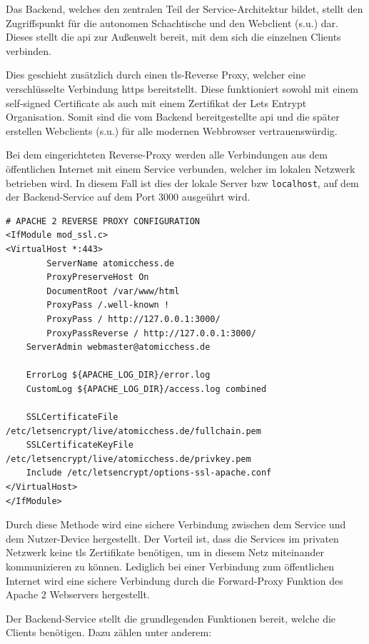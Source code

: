 Das Backend, welches den zentralen Teil der Service-Architektur bildet,
stellt den Zugriffspunkt für die autonomen Schachtische und den
Webclient (s.u.) dar. Dieses stellt die \gls{api} zur Außenwelt bereit,
mit dem sich die einzelnen Clients verbinden.

Dies geschieht zusätzlich durch einen \gls{tls}-Reverse Proxy, welcher
eine verschlüsselte Verbindung \gls{https} bereitstellt. Diese
funktioniert sowohl mit einem self-signed Certificate als auch mit einem
Zertifikat der Lets Entrypt Organisation\cite{letsencrpyt}. Somit
sind die vom Backend bereitgestellte \gls{api} und die später erstellen
Webclients (s.u.) für alle modernen Webbrowser vertrauenswürdig.

Bei dem eingerichteten Reverse-Proxy werden alle Verbindungen aus dem
öffentlichen Internet mit einem Service verbunden, welcher im lokalen
Netzwerk betrieben wird. In diesem Fall ist dies der lokale Server bzw
\passthrough{\lstinline!localhost!}, auf dem der Backend-Service auf dem
Port 3000 ausgeührt wird.

\begin{lstlisting}
# APACHE 2 REVERSE PROXY CONFIGURATION
<IfModule mod_ssl.c>
<VirtualHost *:443>
        ServerName atomicchess.de
        ProxyPreserveHost On 
        DocumentRoot /var/www/html
        ProxyPass /.well-known !
        ProxyPass / http://127.0.0.1:3000/
        ProxyPassReverse / http://127.0.0.1:3000/    
    ServerAdmin webmaster@atomicchess.de

    ErrorLog ${APACHE_LOG_DIR}/error.log
    CustomLog ${APACHE_LOG_DIR}/access.log combined

    SSLCertificateFile /etc/letsencrypt/live/atomicchess.de/fullchain.pem
    SSLCertificateKeyFile /etc/letsencrypt/live/atomicchess.de/privkey.pem
    Include /etc/letsencrypt/options-ssl-apache.conf
</VirtualHost>
</IfModule>
\end{lstlisting}

Durch diese Methode wird eine sichere Verbindung zwischen dem Service
und dem Nutzer-Device hergestellt. Der Vorteil ist, dass die Services im
privaten Netzwerk keine \gls{tls} Zertifikate benötigen, um in diesem
Netz miteinander kommunizieren zu können. Lediglich bei einer Verbindung
zum öffentlichen Internet wird eine sichere Verbindung durch die
Forward-Proxy Funktion des Apache 2 Webservers hergestellt.

Der Backend-Service stellt die grundlegenden Funktionen bereit, welche
die Clients benötigen. Dazu zählen unter anderem:

